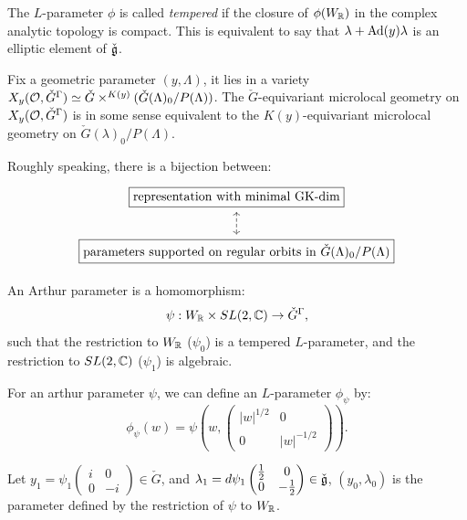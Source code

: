 The $L$-parameter $\phi$ is called \emph{tempered} if the closure of $\phi(W_{\mathbb{R}})$ in the complex analytic topology is compact. This is equivalent to say that $\lambda + \operatorname{Ad}(y)\lambda$ is an elliptic element of $\check{\mathfrak{g}}$.

Fix a geometric parameter $(y, \Lambda)$, it lies in a variety $X_y(\mathcal{O},\check{G}^{\Gamma}) \simeq \check{G} \times^{K(y)}(\check{G}(\Lambda)_0/P(\Lambda))$. The $\check{G}$-equivariant microlocal geometry on $X_y(\mathcal{O},\check{G}^{\Gamma})$ is in some sense equivalent to the $K(y)$-equivariant microlocal geometry on $\check{G}(\lambda)_0/P(\Lambda)$.


Roughly speaking, there is a bijection between:
\[
\begin{tikzcd}
  \boxed{\text{representation with minimal GK-dim}} \arrow[d,dashed,leftrightarrow]\\
  \boxed{\text{parameters supported on regular orbits in $\check{G}(\Lambda)_0/P(\Lambda)$}}
\end{tikzcd}
\]


\begin{defn}
  An Arthur parameter is a homomorphism:
\[\psi : W_{\mathbb{R}} \times SL(2,\mathbb{C}) \to \check{G}^{\Gamma},\]
such that the restriction to $W_{\mathbb{R}}$ ($\psi_0$) is a tempered $L$-parameter, and the restriction to $SL(2,\mathbb{C})$ ($\psi_1$) is algebraic.
\end{defn}


For an arthur parameter $\psi$, we can define an $L$-parameter $\phi_{\psi}$ by:
\[\phi_{\psi}(w) = \psi(w, \begin{pmatrix}|w|^{1/2} & 0 \\ 0 & |w|^{-1/2}\end{pmatrix}).\]

Let $y_1 = \psi_1\begin{pmatrix} i & 0 \\ 0 & -i  \end{pmatrix} \in \check{G}$, and $\lambda_1  = d\psi_1 \begin{pmatrix}\frac{1}{2} & 0 \\ 0 & -\frac{1}{2} \end{pmatrix} \in \check{\mathfrak{g}}$, $(y_0,\lambda_0)$ is the parameter defined by the restriction of $\psi$ to $W_{\mathbb{R}}$.

